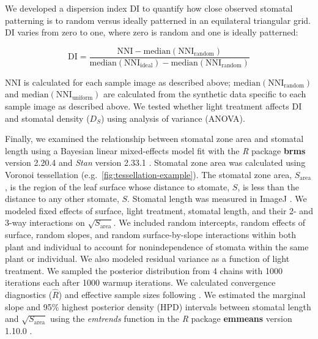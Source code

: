 \documentclass[webpdf,large,modern,unnumsec,namedate]{oup-authoring-template}
\begin{document}
We developed a dispersion index \(\mathrm{DI}\) to quantify how close
observed stomatal patterning is to random versus ideally patterned in an
equilateral triangular grid. \(\mathrm{DI}\) varies from zero to one,
where zero is random and one is ideally patterned:

\begin{equation}\label{eq:disp}
  \mathrm{DI} = \frac{\mathrm{NNI} - \text{median}(\mathrm{NNI_{random}})}{\text{median}(\mathrm{NNI_{ideal}}) - \text{median}(\mathrm{NNI_{random}})}
\end{equation}

\noindent \(\mathrm{NNI}\) is calculated for each sample image as
described above; \(\text{median}(\mathrm{NNI_{random}})\) and
\(\text{median}(\mathrm{NNI_{uniform}})\) are calculated from the
synthetic data specific to each sample image as described above. We
tested whether light treatment affects \(\mathrm{DI}\) and stomatal
density (\(D_S\)) using analysis of variance (ANOVA).

Finally, we examined the relationship between stomatal zone area and
stomatal length using a Bayesian linear mixed-effects model fit with the
\emph{R} package \textbf{brms} version 2.20.4
\citep{burkner_brms_2017, burkner_advanced_2018} and \emph{Stan} version
2.33.1 \citep{stan_development_team_stan_2023}. Stomatal zone area was
calculated using Voronoi tessellation
(e.g.~\autoref{fig:tessellation-example}). The stomatal zone area,
\(S_\text{area}\), is the region of the leaf surface whose distance to
stomate, \(S\), is less than the distance to any other stomate, \(S\).
Stomatal length was measured in ImageJ \citep{schneider_nih_2012}. We
modeled fixed effects of surface, light treatment, stomatal length, and
their 2- and 3-way interactions on \(\sqrt{S_\text{area}}\). We included
random intercepts, random effects of surface, random slopes, and random
surface-by-slope interactions within both plant and individual to
account for nonindependence of stomata within the same plant or
individual. We also modeled residual variance as a function of light
treatment. We sampled the posterior distribution from 4 chains with 1000
iterations each after 1000 warmup iterations. We calculated convergence
diagnostics (\(\hat{R}\)) and effective sample sizes following
\citet{vehtari_rank-normalization_2021}. We estimated the marginal slope
and 95\% highest posterior density (HPD) intervals between stomatal
length and \(\sqrt{S_\text{area}}\) using the \emph{emtrends} function
in the \emph{R} package \textbf{emmeans} version 1.10.0
\citep{lenth_emmeans_2023}.
\end{document}
